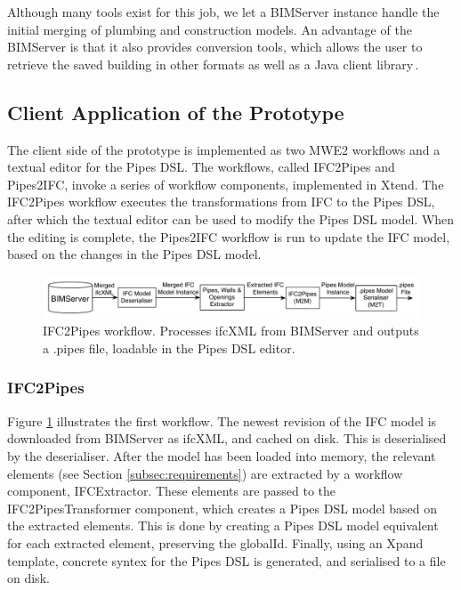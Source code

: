 Although many tools exist for this job, we let a BIMServer instance handle the initial merging of plumbing and construction models. An advantage of the BIMServer is that it also provides conversion tools, which allows the user to retrieve the saved building in other formats as well as a Java client library\,\cite{beetz10}.

\subsection{Client Application of the Prototype}
The client side of the prototype is implemented as two MWE2 workflows and a textual editor for the Pipes DSL. The workflows, called IFC2Pipes and Pipes2IFC, invoke a series of workflow components, implemented in Xtend. The IFC2Pipes workflow executes the transformations from IFC to the Pipes DSL, after which the textual editor can be used to modify the Pipes DSL model. When the editing is complete, the Pipes2IFC workflow is run to update the IFC model, based on the changes in the Pipes DSL model.

\begin{figure}[t]
    \centering
        \includegraphics[width=114mm]{images/IFC2Pipes.pdf}
    \caption{IFC2Pipes workflow. Processes ifcXML from BIMServer and outputs a .pipes file, loadable in the Pipes DSL editor.}
    \label{fig:IFC2PipesWorkflow}
\end{figure}
\subsubsection{IFC2Pipes}
Figure \ref{fig:IFC2PipesWorkflow} illustrates the first workflow. The newest revision of the IFC model is downloaded from BIMServer as ifcXML, and cached on disk. This is deserialised by the deserialiser. After the model has been loaded into memory, the relevant elements (see Section \ref{subsec:requirements}) are extracted by a workflow component, IFCExtractor. These elements are passed to the IFC2PipesTransformer component, which creates a Pipes DSL model based on the extracted elements. This is done by creating a Pipes DSL model equivalent for each extracted element, preserving the globalId. Finally, using an Xpand template, concrete syntex for the Pipes DSL is generated, and serialised to a file on disk.

